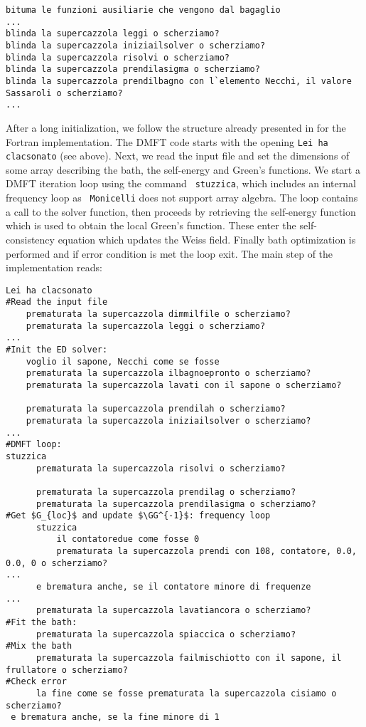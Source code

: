 \documentclass[edipack_sp.tex]{subfiles}
\begin{document}
\lstset{breaklines=true, breakindent=1em}
\begin{lstlisting}[style=MonicelliStyle,numbers=none]
bituma le funzioni ausiliarie che vengono dal bagaglio
...
blinda la supercazzola leggi o scherziamo?
blinda la supercazzola iniziailsolver o scherziamo?
blinda la supercazzola risolvi o scherziamo?
blinda la supercazzola prendilasigma o scherziamo?
blinda la supercazzola prendilbagno con l`elemento Necchi, il valore Sassaroli o scherziamo?
...
\end{lstlisting}

After a long initialization, we follow the structure already presented
in  for the Fortran implementation.
The DMFT code starts with the opening {\tt Lei ha clacsonato} (see
above). Next, we read the input file and set the dimensions of some
array describing the bath, the self-energy and Green's
functions. We start a DMFT iteration loop using the command {\tt
  stuzzica}, which includes an internal frequency loop as {\tt
  Monicelli} does not support array algebra.
The loop contains a call to the \NAME solver function, then proceeds
by retrieving the self-energy function which is used to obtain the
local Green's function. These enter the self-consistency equation
which updates the Weiss field. Finally bath optimization is performed
and if error condition is met the loop exit.
The main step of the implementation reads: 


\begin{lstlisting}[style=MonicelliStyle,numbers=none]
Lei ha clacsonato
#Read the input file
    prematurata la supercazzola dimmilfile o scherziamo?
    prematurata la supercazzola leggi o scherziamo? 
...                                                  
#Init the ED solver:
    voglio il sapone, Necchi come se fosse
    prematurata la supercazzola ilbagnoepronto o scherziamo?
    prematurata la supercazzola lavati con il sapone o scherziamo?
        
    prematurata la supercazzola prendilah o scherziamo?
    prematurata la supercazzola iniziailsolver o scherziamo?
...
#DMFT loop:
stuzzica    
      prematurata la supercazzola risolvi o scherziamo?
      
      prematurata la supercazzola prendilag o scherziamo?
      prematurata la supercazzola prendilasigma o scherziamo?
#Get $G_{loc}$ and update $\GG^{-1}$: frequency loop
      stuzzica                   
          il contatoredue come fosse 0
          prematurata la supercazzola prendi con 108, contatore, 0.0, 0.0, 0 o scherziamo?
...
      e brematura anche, se il contatore minore di frequenze
...      
      prematurata la supercazzola lavatiancora o scherziamo?
#Fit the bath:       
      prematurata la supercazzola spiaccica o scherziamo?
#Mix the bath           
      prematurata la supercazzola failmischiotto con il sapone, il frullatore o scherziamo?
#Check error      
      la fine come se fosse prematurata la supercazzola cisiamo o scherziamo?         
 e brematura anche, se la fine minore di 1
\end{lstlisting}
\end{document}
